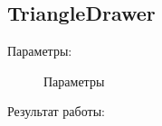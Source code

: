 \documentclass[14pt,a4paper,report]{report}
\begin{document}
\clearpage
\subsection{TriangleDrawer}
Параметры:

\begin{figure}[h!]
\caption{Параметры}
\label{ris:image}
\end{figure}

Результат работы: 
\end{document}
